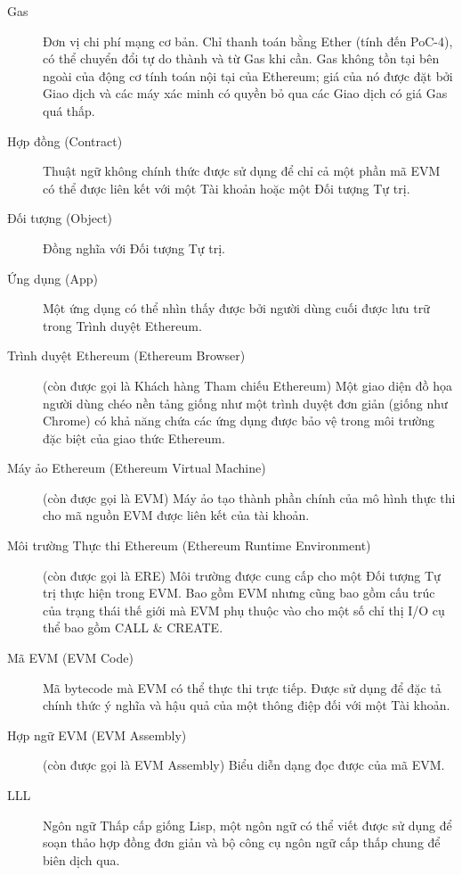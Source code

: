 \documentclass[9pt,oneside]{amsart}
\begin{document}
\begin{description}
\item[Gas] Đơn vị chi phí mạng cơ bản. Chỉ thanh toán bằng Ether (tính đến PoC-4), có thể chuyển đổi tự do thành và từ Gas khi cần. Gas không tồn tại bên ngoài của động cơ tính toán nội tại của Ethereum; giá của nó được đặt bởi Giao dịch và các máy xác minh có quyền bỏ qua các Giao dịch có giá Gas quá thấp.

\item[Hợp đồng (Contract)] Thuật ngữ không chính thức được sử dụng để chỉ cả một phần mã EVM có thể được liên kết với một Tài khoản hoặc một Đối tượng Tự trị.

\item[Đối tượng (Object)] Đồng nghĩa với Đối tượng Tự trị.

\item[Ứng dụng (App)] Một ứng dụng có thể nhìn thấy được bởi người dùng cuối được lưu trữ trong Trình duyệt Ethereum.

\item[Trình duyệt Ethereum (Ethereum Browser)] (còn được gọi là Khách hàng Tham chiếu Ethereum) Một giao diện đồ họa người dùng chéo nền tảng giống như một trình duyệt đơn giản (giống như Chrome) có khả năng chứa các ứng dụng được bảo vệ trong môi trường đặc biệt của giao thức Ethereum.

\item[Máy ảo Ethereum (Ethereum Virtual Machine)] (còn được gọi là EVM) Máy ảo tạo thành phần chính của mô hình thực thi cho mã nguồn EVM được liên kết của tài khoản.

\item[Môi trường Thực thi Ethereum (Ethereum Runtime Environment)] (còn được gọi là ERE) Môi trường được cung cấp cho một Đối tượng Tự trị thực hiện trong EVM. Bao gồm EVM nhưng cũng bao gồm cấu trúc của trạng thái thế giới mà EVM phụ thuộc vào cho một số chỉ thị I/O cụ thể bao gồm CALL \& CREATE.

\item[Mã EVM (EVM Code)] Mã bytecode mà EVM có thể thực thi trực tiếp. Được sử dụng để đặc tả chính thức ý nghĩa và hậu quả của một thông điệp đối với một Tài khoản.

\item[Hợp ngữ EVM (EVM Assembly)] (còn được gọi là EVM Assembly) Biểu diễn dạng đọc được của mã EVM.

\item[LLL] Ngôn ngữ Thấp cấp giống Lisp, một ngôn ngữ có thể viết được sử dụng để soạn thảo hợp đồng đơn giản và bộ công cụ ngôn ngữ cấp thấp chung để biên dịch qua.

\end{description}
\end{document}
